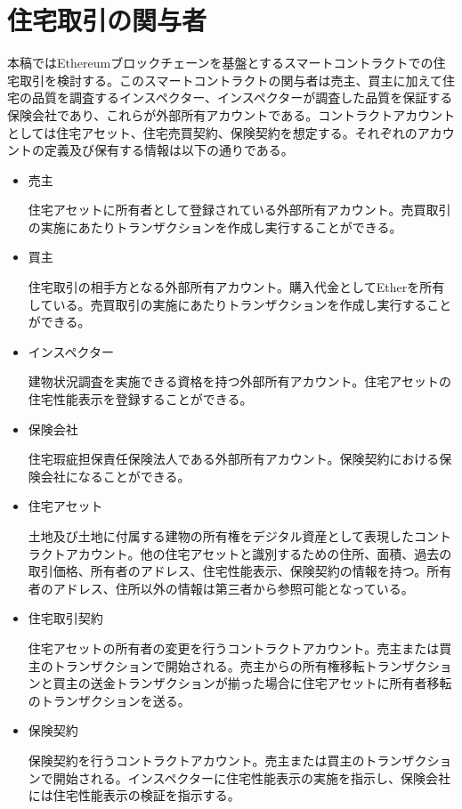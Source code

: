 \documentclass[a4paper,fontsize=11pt,report,notitlepage,line_length=38zw,number_of_lines=40,dvipdfmx]{jlreq}
\begin{document}
\section{住宅取引の関与者}
本稿ではEthereumブロックチェーンを基盤とするスマートコントラクトでの住宅取引を検討する。このスマートコントラクトの関与者は売主、買主に加えて住宅の品質を調査するインスペクター、インスペクターが調査した品質を保証する保険会社であり、これらが外部所有アカウントである。コントラクトアカウントとしては住宅アセット、住宅売買契約、保険契約を想定する。それぞれのアカウントの定義及び保有する情報は以下の通りである。
\begin{itemize}
	\item 売主
    \par 住宅アセットに所有者として登録されている外部所有アカウント。売買取引の実施にあたりトランザクションを作成し実行することができる。
    \item 買主
    \par 住宅取引の相手方となる外部所有アカウント。購入代金としてEtherを所有している。売買取引の実施にあたりトランザクションを作成し実行することができる。
    \item インスペクター
    \par 建物状況調査を実施できる資格を持つ外部所有アカウント。住宅アセットの住宅性能表示を登録することができる。
    \item 保険会社
    \par 住宅瑕疵担保責任保険法人である外部所有アカウント。保険契約における保険会社になることができる。
	\item 住宅アセット	
	\par 土地及び土地に付属する建物の所有権をデジタル資産として表現したコントラクトアカウント。他の住宅アセットと識別するための住所、面積、過去の取引価格、所有者のアドレス、住宅性能表示、保険契約の情報を持つ。所有者のアドレス、住所以外の情報は第三者から参照可能となっている。
	\item 住宅取引契約
    \par 住宅アセットの所有者の変更を行うコントラクトアカウント。売主または買主のトランザクションで開始される。売主からの所有権移転トランザクションと買主の送金トランザクションが揃った場合に住宅アセットに所有者移転のトランザクションを送る。
	\item 保険契約
    \par 保険契約を行うコントラクトアカウント。売主または買主のトランザクションで開始される。インスペクターに住宅性能表示の実施を指示し、保険会社には住宅性能表示の検証を指示する。
\end{itemize}
\end{document}
